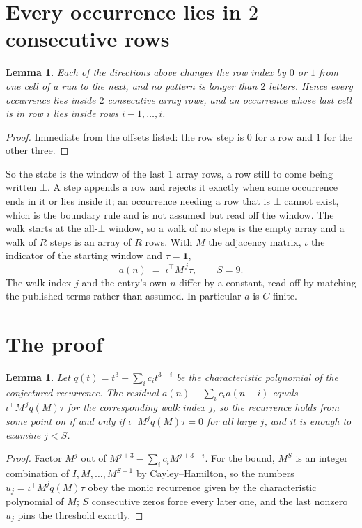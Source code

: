 \documentclass[11pt,a4paper]{article}
\theoremstyle{plain}
\newtheorem{lemma}[theorem]{Lemma}
\theoremstyle{definition}
\begin{document}
\section{Every occurrence lies in $2$ consecutive rows}

\begin{lemma}\label{lem:win}
Each of the directions above changes the row index by $0$ or $1$ from one cell of a run to the
next, and no pattern is longer than $2$ letters. Hence every occurrence lies inside $2$
consecutive array rows, and an occurrence whose last cell is in row $i$ lies inside rows
$i-1,\dots,i$.
\end{lemma}

\begin{proof}
Immediate from the offsets listed: the row step is $0$ for a row and $1$ for the other three.
\end{proof}

So the state is the window of the last $1$ array rows, a row still to come being written
$\bot$. A step appends a row and rejects it exactly when some occurrence ends in it or lies
inside it; an occurrence needing a row that is $\bot$ cannot exist, which is the boundary rule
and is not assumed but read off the window. The walk starts at the all-$\bot$ window, so a walk
of no steps is the empty array and a walk of $R$ steps is an array of $R$ rows. With $M$ the
adjacency matrix, $\iota$ the indicator of the starting window and $\tau=\mathbf{1}$,
\[
a(n)\;=\;\iota^{\!\top}M^{\,j}\tau ,\qquad S=9.
\]
The walk index $j$ and the entry's own $n$ differ by a constant, read off by matching the
published terms rather than assumed. In particular $a$ is $C$-finite.

\section{The proof}

\begin{lemma}\label{lem:crit}
Let $q(t)=t^{3}-\sum_i c_it^{3-i}$ be the characteristic polynomial of the
conjectured recurrence. The residual $a(n)-\sum_ic_ia(n-i)$ equals
$\iota^{\!\top}M^{\,j}q(M)\tau$ for the corresponding walk index $j$, so the recurrence
holds from some point on if and only if $\iota^{\!\top}M^{j}q(M)\tau=0$ for all large $j$,
and it is enough to examine $j<S$.
\end{lemma}

\begin{proof}
Factor $M^{j}$ out of $M^{j+3}-\sum_ic_iM^{j+3-i}$. For the bound, $M^{S}$
is an integer combination of $I,M,\dots,M^{S-1}$ by Cayley--Hamilton, so the numbers
$u_j=\iota^{\!\top}M^{j}q(M)\tau$ obey the monic recurrence given by the characteristic
polynomial of $M$; $S$ consecutive zeros force every later one, and the last nonzero $u_j$
pins the threshold exactly.
\end{proof}
\end{document}
